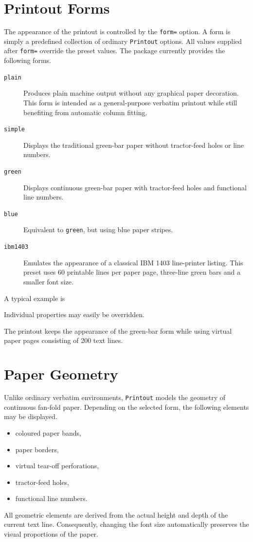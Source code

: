 \documentclass[
11pt,
a4paper,
oneside
]{scrbook}
\begin{document}
\section{Printout Forms}

The appearance of the printout is controlled by the
\texttt{form=} option.
A form is simply a predefined collection of ordinary
\texttt{Printout} options.
All values supplied after \texttt{form=} override the preset values.
The package currently provides the following forms.
\begin{description}
	\item[\texttt{plain}]
	Produces plain machine output without any graphical paper decoration.
	This form is intended as a general-purpose verbatim printout while still
	benefiting from automatic column fitting.
	
	\item[\texttt{simple}]
	Displays the traditional green-bar paper without tractor-feed holes or
	line numbers.

	\item[\texttt{green}]
	Displays continuous green-bar paper with tractor-feed holes and
	functional line numbers.
	
	\item[\texttt{blue}]
	Equivalent to \texttt{green}, but using blue paper stripes.
	
	\item[\texttt{ibm1403}]
	Emulates the appearance of a classical IBM 1403 line-printer listing.
	This preset uses 60 printable lines per paper page, three-line green
	bars and a smaller font size.
\end{description}
A typical example is




Individual properties may easily be overridden.




The printout keeps the appearance of the green-bar form while using
virtual paper pages consisting of 200 text lines.

\section{Paper Geometry}
Unlike ordinary verbatim environments, \texttt{Printout} models the
geometry of continuous fan-fold paper.
Depending on the selected form, the following elements may be displayed.
\begin{itemize}
	\item coloured paper bands,
	\item paper borders,
	\item virtual tear-off perforations,
	\item tractor-feed holes,
	\item functional line numbers.
\end{itemize}
All geometric elements are derived from the actual height and depth of
the current text line. Consequently, changing the font size
automatically preserves the visual proportions of the paper.
\end{document}
